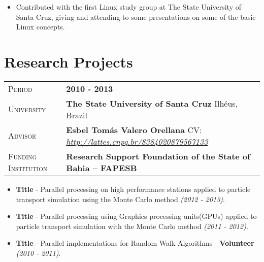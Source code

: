 \documentclass[10pt, a4paper, oneside, final]{scrartcl} %
\newcommand{\gray}{\rowcolor[gray]{.90}} %
\begin{document}
\begin{itemize}\itemsep1.5pt
\item Contributed with the first Linux study group at The State University of Santa Cruz, giving and attending to some presentations on some of the basic Linux concepts.
\end{itemize}


\section{Research Projects}

\begin{center}
\begin{tabularx}{1.0\linewidth}{>{\raggedleft\scshape}p{2.34cm}X}
\gray Period & \textbf{2010 - 2013}\\
\gray University & \textbf{The State University of Santa Cruz} \hfill Ilhéus, Brazil\\
\gray Advisor & \textbf{Esbel Tomás Valero Orellana} \hfill CV: \hyperref[Esbel Valero]{\textit{http://lattes.cnpq.br/8384020879567133}}\\
\gray Funding Institution & \textbf{Research Support Foundation of the State of Bahia – FAPESB}
\end{tabularx}
\end{center}

\begin{itemize}\itemsep1.5pt
\item \textbf{Title} - Parallel processing on high performance stations applied to particle transport simulation using the Monte Carlo method \textit{(2012 - 2013)}.

\item \textbf{Title} - Parallel processing using Graphics processing units(GPUs) applied to particle transport simulation with the Monte Carlo method \textit{(2011 - 2012)}.

\item \textbf{Title} - Parallel implementations for Random Walk Algorithms - \textbf{Volunteer} \textit{(2010 - 2011)}.
\end{itemize}

\end{document}
